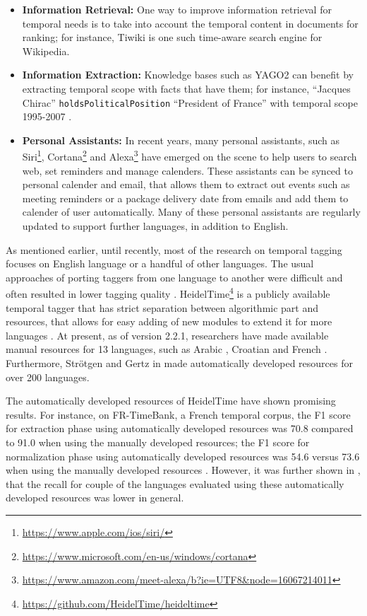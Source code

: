 \begin{itemize}
	\item \textbf{Information Retrieval:} One way to improve information retrieval for temporal needs is to take into account the temporal content in documents for ranking; for instance, Tiwiki \cite{DBLP:conf/www/AgarwalS17} is one such time-aware search engine for Wikipedia.  
	\item \textbf{Information Extraction:} Knowledge bases such as YAGO2 \cite{DBLP:journals/ai/HoffartSBW13} can benefit by extracting temporal scope with facts that have them; for instance, ``Jacques Chirac'' \texttt{holdsPoliticalPosition} ``President of France'' with temporal scope 1995-2007 \cite{DBLP:conf/www/KuzeyW12}. 
	\item \textbf{Personal Assistants:} In recent years, many personal assistants, such as Siri\footnote{\url{https://www.apple.com/ios/siri/}}, Cortana\footnote{\url{https://www.microsoft.com/en-us/windows/cortana}} and Alexa\footnote{\url{https://www.amazon.com/meet-alexa/b?ie=UTF8&node=16067214011}} have emerged on the scene to help users to search web, set reminders and manage calenders. These assistants can be synced to personal calender and email, that allows them to extract out events such as meeting reminders or a package delivery date from emails and add them to calender of user automatically. Many of these personal assistants are regularly updated to support further languages, in addition to English.
\end{itemize}

As mentioned earlier, until recently, most of the research on temporal tagging focuses on English language or a handful of other languages. The usual approaches of porting taggers from one language to another were difficult and often resulted in lower tagging quality \cite{DBLP:phd/de/Strotgen15}. HeidelTime\footnote{\url{https://github.com/HeidelTime/heideltime}} is a publicly available temporal tagger that has strict separation between algorithmic part and resources, that allows for easy adding of new modules to extend it for more languages \cite{DBLP:phd/de/Strotgen15}. At present, as of version 2.2.1, researchers have made available manual resources for 13 languages, such as Arabic \cite{strotgen2014time}, Croatian \cite{skukan2014heideltime} and French \cite{moriceau2013french}. Furthermore, Str{\"{o}}tgen and Gertz  in \cite{DBLP:conf/emnlp/StrotgenG15} made automatically developed resources for over 200 languages. 

The automatically developed resources of HeidelTime have shown promising results. For instance, on FR-TimeBank, a French temporal corpus, the F1 score for extraction phase using automatically developed resources was 70.8 compared to 91.0 when using the manually developed resources; the F1 score for normalization phase using automatically developed resources was 54.6 versus 73.6 when using the manually developed resources \cite{DBLP:conf/emnlp/StrotgenG15}. However, it was further shown in \cite{DBLP:conf/emnlp/StrotgenG15}, that the recall for couple of the languages evaluated using these automatically developed resources was lower in general. 

